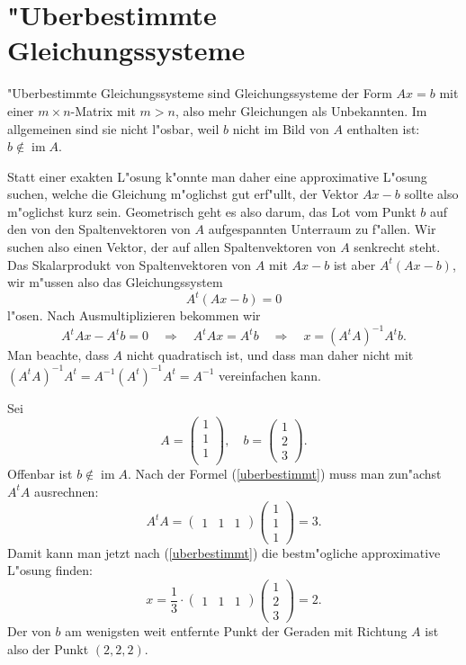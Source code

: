 \section{"Uberbestimmte Gleichungssysteme\label{section:ueberbestimmt}}
"Uberbestimmte Gleichungssysteme sind Gleichungssysteme der Form
$Ax=b$ mit einer $m\times n$-Matrix mit $m>n$, also mehr Gleichungen
als Unbekannten. Im allgemeinen sind sie nicht l"osbar, weil $b$ nicht
im Bild von $A$ enthalten ist: $b\not\in \operatorname{im}A$.

Statt einer exakten L"osung k"onnte man daher eine approximative
L"osung suchen, welche die Gleichung m"oglichst gut erf"ullt,
der Vektor $Ax-b$ sollte also m"oglichst kurz sein. Geometrisch
geht es also darum, das Lot vom Punkt $b$ auf den von den Spaltenvektoren
von $A$ aufgespannten Unterraum zu f"allen. Wir suchen also
einen Vektor, der auf allen Spaltenvektoren von $A$ senkrecht steht.
Das Skalarprodukt von Spaltenvektoren von $A$ mit $Ax-b$ ist aber
$A^t(Ax-b)$, wir m"ussen also das Gleichungssystem
\[A^t(Ax-b)=0\]
l"osen. Nach Ausmultiplizieren bekommen wir
\begin{equation}
A^tAx-A^tb=0\quad\Rightarrow\quad A^tAx=A^tb\quad\Rightarrow\quad
x=(A^tA)^{-1}A^tb.
\label{uberbestimmt}
\end{equation}
Man beachte, dass $A$ nicht quadratisch ist, und dass man daher
nicht mit $(A^tA)^{-1}A^t=A^{-1}(A^t)^{-1}A^t=A^{-1}$ vereinfachen
kann.

\begin{beispiel}
Sei 
\[
A=\begin{pmatrix}1\\1\\1\\\end{pmatrix},\quad b=\begin{pmatrix}1\\2\\3\end{pmatrix}.
\]
Offenbar ist $b\not\in\operatorname{im}A$.  Nach der Formel (\ref{uberbestimmt})
muss man zun"achst $A^tA$ ausrechnen:
\[
A^tA=\begin{pmatrix}1&1&1\end{pmatrix}\begin{pmatrix}1\\1\\1\end{pmatrix}=3.
\]
Damit kann man jetzt nach (\ref{uberbestimmt}) die bestm"ogliche
approximative L"osung finden:
\[
x=\frac13\cdot\begin{pmatrix}1&1&1\end{pmatrix}
\begin{pmatrix}1\\2\\3\end{pmatrix}=2.
\]
Der von $b$ am wenigsten weit entfernte Punkt der Geraden mit
Richtung $A$ ist also der Punkt $(2,2,2)$.
\end{beispiel}
